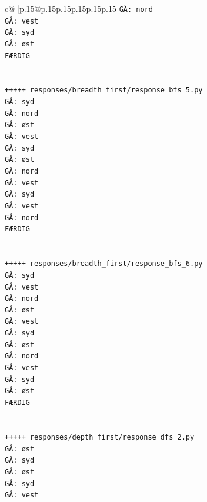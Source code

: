 \documentclass{article}
\begin{document}
{\begin{supertabular}{c@{$\;$}|p{.15\linewidth}@{}p{.15\linewidth}p{.15\linewidth}p{.15\linewidth}p{.15\linewidth}p{.15\linewidth}}
{{{\texttt{GÅ: nord} \\
\texttt{GÅ: vest} \\
\texttt{GÅ: syd} \\
\texttt{GÅ: øst} \\
\texttt{FÆRDIG} \\
\\ 
\\ 
\texttt{+++++ responses/breadth\_first/response\_bfs\_5.py} \\
\texttt{GÅ: syd} \\
\texttt{GÅ: nord} \\
\texttt{GÅ: øst} \\
\texttt{GÅ: vest} \\
\texttt{GÅ: syd} \\
\texttt{GÅ: øst} \\
\texttt{GÅ: nord} \\
\texttt{GÅ: vest} \\
\texttt{GÅ: syd} \\
\texttt{GÅ: vest} \\
\texttt{GÅ: nord} \\
\texttt{FÆRDIG} \\
\\ 
\\ 
\texttt{+++++ responses/breadth\_first/response\_bfs\_6.py} \\
\texttt{GÅ: syd} \\
\texttt{GÅ: vest} \\
\texttt{GÅ: nord} \\
\texttt{GÅ: øst} \\
\texttt{GÅ: vest} \\
\texttt{GÅ: syd} \\
\texttt{GÅ: øst} \\
\texttt{GÅ: nord} \\
\texttt{GÅ: vest} \\
\texttt{GÅ: syd} \\
\texttt{GÅ: øst} \\
\texttt{FÆRDIG} \\
\\ 
\\ 
\texttt{+++++ responses/depth\_first/response\_dfs\_2.py} \\
\texttt{GÅ: øst} \\
\texttt{GÅ: syd} \\
\texttt{GÅ: øst} \\
\texttt{GÅ: syd} \\
\texttt{GÅ: vest} \\
}}}
\end{supertabular}}
\end{document}
